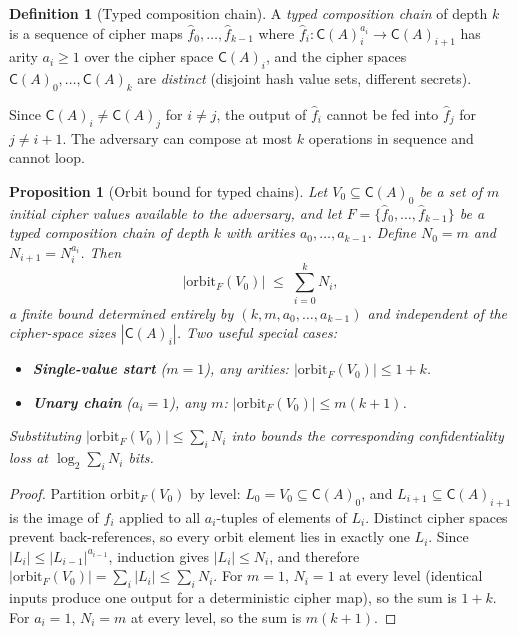 \documentclass[11pt]{article}
\theoremstyle{definition}
\newtheorem{definition}{Definition}[section]
\theoremstyle{plain}
\newtheorem{proposition}[theorem]{Proposition}
\theoremstyle{remark}
\newcommand{\fhat}{\hat{f}}
\newcommand{\cipher}[1]{\mathsf{C}(#1)}
\newcommand{\orbitF}{\mathrm{orbit}_F}
\begin{document}
\begin{definition}[Typed composition chain]
\label{def:typed-chain}
A \emph{typed composition chain} of depth $k$ is a sequence of
cipher maps $\fhat_0, \ldots, \fhat_{k-1}$ where
$\fhat_i : \cipher{A}_i^{a_i} \to \cipher{A}_{i+1}$ has arity
$a_i \geq 1$ over the cipher space $\cipher{A}_i$, and the cipher
spaces $\cipher{A}_0, \ldots, \cipher{A}_k$ are \emph{distinct}
(disjoint hash value sets, different secrets).
\end{definition}

Since $\cipher{A}_i \neq \cipher{A}_j$ for $i \neq j$, the output of
$\fhat_i$ cannot be fed into $\fhat_j$ for $j \neq i+1$.
The adversary can compose at most $k$ operations in sequence and cannot
loop.

\begin{proposition}[Orbit bound for typed chains]
\label{prop:typed-orbit}
Let $V_0 \subseteq \cipher{A}_0$ be a set of $m$ initial cipher values
available to the adversary, and let $F = \{\fhat_0, \ldots, \fhat_{k-1}\}$
be a typed composition chain of depth $k$ with arities
$a_0, \ldots, a_{k-1}$.
Define $N_0 = m$ and $N_{i+1} = N_i^{a_i}$.
Then
\[
|\orbitF(V_0)| \;\leq\; \sum_{i=0}^{k} N_i,
\]
a finite bound determined entirely by $(k, m, a_0, \ldots, a_{k-1})$
and independent of the cipher-space sizes $|\cipher{A}_i|$.
Two useful special cases:
\begin{itemize}
\item \textbf{Single-value start} ($m = 1$), any arities:
  $|\orbitF(V_0)| \leq 1 + k$.
\item \textbf{Unary chain} ($a_i = 1$), any $m$:
  $|\orbitF(V_0)| \leq m(k+1)$.
\end{itemize}
Substituting $|\orbitF(V_0)| \leq \sum_i N_i$ into
 bounds the corresponding
confidentiality loss at $\log_2 \sum_i N_i$ bits.
\end{proposition}

\begin{proof}
Partition $\orbitF(V_0)$ by level: $L_0 = V_0 \subseteq \cipher{A}_0$,
and $L_{i+1} \subseteq \cipher{A}_{i+1}$ is the image of $\fhat_i$
applied to all $a_i$-tuples of elements of $L_i$.
Distinct cipher spaces prevent back-references, so every orbit element
lies in exactly one $L_i$.
Since $|L_i| \leq |L_{i-1}|^{a_{i-1}}$, induction gives $|L_i| \leq N_i$,
and therefore $|\orbitF(V_0)| = \sum_i |L_i| \leq \sum_i N_i$.
For $m = 1$, $N_i = 1$ at every level (identical inputs produce one
output for a deterministic cipher map), so the sum is $1+k$.
For $a_i = 1$, $N_i = m$ at every level, so the sum is $m(k+1)$.
\end{proof}
\end{document}
